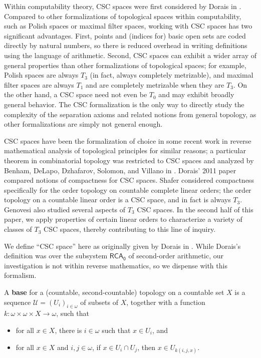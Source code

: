 \documentclass[11pt]{amsart}
\theoremstyle{remark}
\begin{document}
Within computability theory, CSC spaces were first considered by Dorais in \cite{D11}. Compared to other formalizations of topological spaces within computability, such as Polish spaces or maximal filter spaces, working with CSC spaces has two significant advantages. First, points and (indices for) basic open sets are coded directly by natural numbers, so there is reduced overhead in writing definitions using the language of arithmetic. Second, CSC spaces can exhibit a wider array of general properties than other formalizations of topological spaces; for example, Polish spaces are always $T_3$ (in fact, always completely metrizable), and maximal filter spaces are always $T_1$ and are completely metrizable when they are $T_3$. On the other hand, a CSC space need not even be $T_0$ and may exhibit broadly general behavior.
The CSC formalization is the only way to directly study the complexity of the separation axioms and related notions from general topology, as other formalizations are simply not general enough.

CSC spaces have been the formalization of choice in some recent work in reverse mathematical analysis of topological principles for similar reasons; a particular theorem in combinatorial topology was restricted to CSC spaces and analyzed by Benham, DeLapo, Dzhafarov, Solomon, and Villano in \cite{BDDSV24}. Dorais' 2011 paper \cite{D11} compared notions of compactness for CSC spaces. Shafer \cite{S20} considered compactness specifically for the order topology on countable complete linear orders; the order topology on a countable linear order is a CSC space, and in fact is always $T_3$. Genovesi \cite{G24} also studied several aspects of $T_3$ CSC spaces. In the second half of this paper, we apply properties of certain linear orders to characterize a variety of classes of $T_3$ CSC spaces, thereby contributing to this line of inquiry. 

We define ``CSC space'' here as originally given by Dorais in \cite{D11}.
While Dorais's definition was over the subsystem $\mathsf{RCA_0}$ of second-order arithmetic, our investigation is not within reverse mathematics, so we dispense with this formalism.

\begin{definition}
    A \textbf{base} for a (countable, second-countable) topology on a countable set $X$ is a sequence $\mathcal{U} = (U_i)_{i \in \omega}$ of subsets of $X$, together with a function $k: \omega \times \omega \times X \to \omega$, such that
    \begin{itemize}
        \item for all $x \in X$, there is $i \in \omega$ such that $x \in U_i$, and
        \item for all $x \in X$ and $i, j \in \omega$, if $x \in U_i \cap U_j$, then $x \in U_{k(i, j, x)}$.
    \end{itemize}
\end{definition}
\end{document}
